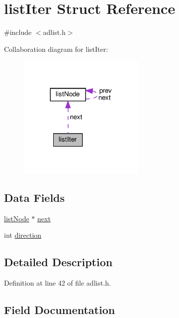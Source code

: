 \hypertarget{structlist_iter}{}\section{list\+Iter Struct Reference}
\label{structlist_iter}


{\ttfamily \#include $<$adlist.\+h$>$}



Collaboration diagram for list\+Iter\+:
\nopagebreak
\begin{figure}[H]
\begin{center}
\leavevmode
\includegraphics[width=173pt]{structlist_iter__coll__graph}
\end{center}
\end{figure}
\subsection*{Data Fields}
\begin{DoxyCompactItemize}
\item 
\hyperlink{structlist_node}{list\+Node} $\ast$ \hyperlink{structlist_iter_af8f3c30b0e82b384ff2f78d3e53b507f}{next}
\item 
int \hyperlink{structlist_iter_a886d551d5381dc3e53f17825ffc51641}{direction}
\end{DoxyCompactItemize}


\subsection{Detailed Description}


Definition at line 42 of file adlist.\+h.



\subsection{Field Documentation}
\mbox{\label{structlist_iter_a886d551d5381dc3e53f17825ffc51641}} 
